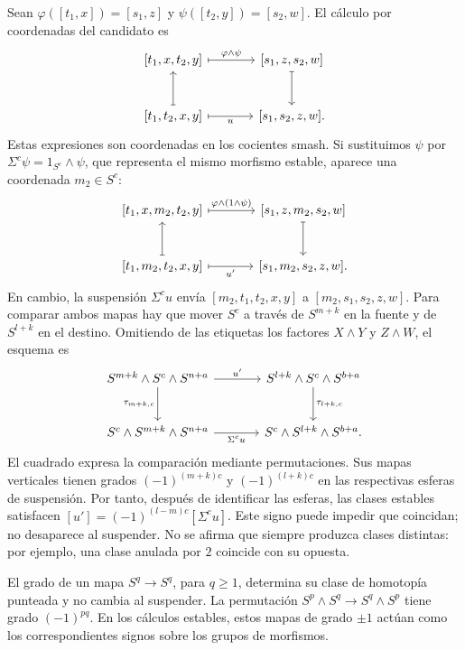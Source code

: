 Sean $\varphi([t_1,x])=[s_1,z]$ y $\psi([t_2,y])=[s_2,w]$. El cálculo por coordenadas del candidato es
\[
\begin{tikzcd}[column sep=large,row sep=large]
{[t_1,x,t_2,y]} \arrow[r,mapsto,"\varphi\wedge\psi"] & {[s_1,z,s_2,w]} \arrow[d,mapsto]\\
{[t_1,t_2,x,y]} \arrow[u,mapsto] \arrow[r,mapsto,"u"'] & {[s_1,s_2,z,w]}.
\end{tikzcd}
\]
Estas expresiones son coordenadas en los cocientes smash. Si sustituimos $\psi$ por $\Sigma^c\psi=1_{S^c}\wedge\psi$, que representa el mismo morfismo estable, aparece una coordenada $m_2\in S^c$:
\[
\begin{tikzcd}[column sep=large,row sep=large]
{[t_1,x,m_2,t_2,y]} \arrow[r,mapsto,"\varphi\wedge(1\wedge\psi)"] & {[s_1,z,m_2,s_2,w]} \arrow[d,mapsto]\\
{[t_1,m_2,t_2,x,y]} \arrow[u,mapsto] \arrow[r,mapsto,"u'"'] & {[s_1,m_2,s_2,z,w]}.
\end{tikzcd}
\]
En cambio, la suspensión $\Sigma^cu$ envía $[m_2,t_1,t_2,x,y]$ a $[m_2,s_1,s_2,z,w]$. Para comparar ambos mapas hay que mover $S^c$ a través de $S^{m+k}$ en la fuente y de $S^{l+k}$ en el destino. Omitiendo de las etiquetas los factores $X\wedge Y$ y $Z\wedge W$, el esquema es
\[
\begin{tikzcd}[column sep=large,row sep=large]
S^{m+k}\wedge S^c\wedge S^{n+a} \arrow[r,"u'"] \arrow[d,"\tau_{m+k,c}"'] & S^{l+k}\wedge S^c\wedge S^{b+a} \arrow[d,"\tau_{l+k,c}"]\\
S^c\wedge S^{m+k}\wedge S^{n+a} \arrow[r,"\Sigma^cu"'] & S^c\wedge S^{l+k}\wedge S^{b+a}.
\end{tikzcd}
\]
El cuadrado expresa la comparación mediante permutaciones. Sus mapas verticales tienen grados $(-1)^{(m+k)c}$ y $(-1)^{(l+k)c}$ en las respectivas esferas de suspensión. Por tanto, después de identificar las esferas, las clases estables satisfacen $[u']=(-1)^{(l-m)c}[\Sigma^cu]$. Este signo puede impedir que coincidan; no desaparece al suspender. No se afirma que siempre produzca clases distintas: por ejemplo, una clase anulada por $2$ coincide con su opuesta.

\begin{nota}
El grado de un mapa $S^q\to S^q$, para $q\ge1$, determina su clase de homotopía punteada y no cambia al suspender. La permutación $S^p\wedge S^q\to S^q\wedge S^p$ tiene grado $(-1)^{pq}$. En los cálculos estables, estos mapas de grado $\pm1$ actúan como los correspondientes signos sobre los grupos de morfismos.
\end{nota}

